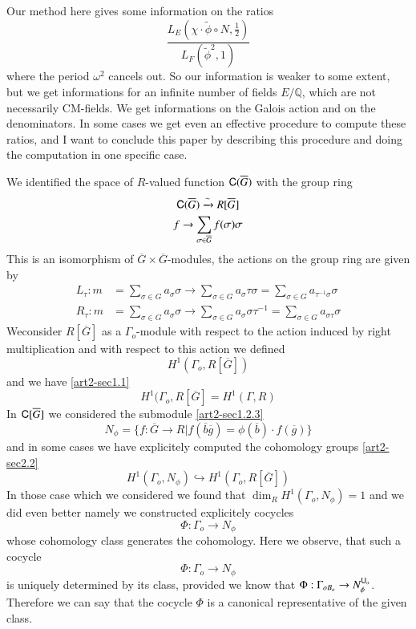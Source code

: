 Our method here gives some information on the ratios
$$
\frac{L_{E}\left(\chi\cdot \widetilde{\phi}\circ N,\frac{1}{2}\right)}{L_{F}(\widetilde{\phi}^{2},1)}
$$
where the period $\omega^{2}$ cancels out. So our information is weaker to some extent, but we get informations for an infinite number of fields $E/\mathbb{Q}$, which are not necessarily CM-fields. We get informations on the Galois action and on the denominators. In some cases we get even an effective procedure to compute these ratios, and I want to conclude this paper by describing this procedure and doing the computation in one specific case.

We identified the space of $R$-valued function $\mathsf{C}(\overline{G})$ with the group ring
\begin{gather*}
\mathsf{C}(\overline{G})\xrightarrow{\sim}R[\overline{G}]\\
f\to \sum\limits_{\sigma\in \overline{G}}f(\sigma)\sigma
\end{gather*}
This is an isomorphism of $\overline{G}\times \overline{G}$-modules, the actions on the group ring are given by
\begin{align*}
L_{\tau}:m &= \sum\limits_{\sigma\in G}a_{\sigma}\sigma\to \sum\limits_{\sigma\in G}a_{\sigma}\tau \sigma=\sum\limits_{\sigma\in G}a_{\tau^{-1}\sigma}\sigma\\[4pt]
R_{\tau}:m &=\sum\limits_{\sigma\in G}a_{\sigma}\sigma\to \sum\limits_{\sigma\in G}a_{\sigma}\sigma \tau^{-1}=\sum\limits_{\sigma\in G}a_{\sigma\tau}\sigma
\end{align*}
We\pageoriginale consider $R[\overline{G}]$ as a $\Gamma_{o}$-module with respect to the action induced by right multiplication and with respect to this action we defined 
$$
H^{1}(\Gamma_{o},R[\overline{G}])
$$ 
and we have \eqref{art2-sec1.1}
$$
H^{1}(\Gamma_{o},R[\overline{G}]=H^{1}(\Gamma,R)
$$
In $\mathsf{C}[\overline{G}]$ we considered the submodule \eqref{art2-sec1.2.3}
$$
N_{\phi}=\{f:\overline{G}\to R|f(\overline{b}\overline{g})=\phi(\overline{b})\cdot f(\overline{g})\}
$$
and in some cases we have explicitely computed the cohomology groups \eqref{art2-sec2.2}
$$
H^{1}(\Gamma_{o},N_{\phi})\hookrightarrow H^{1}(\Gamma_{o},R[\overline{G}])
$$
In those case which we considered we found that $\dim_{R}H^{1}(\Gamma_{o},N_{\phi})=1$ and we did even better namely we constructed explicitely cocycles
$$
\Phi:\Gamma_{o}\to N_{\phi}
$$
whose cohomology class generates the cohomology. Here we observe, that such a cocycle
$$
\Phi :\Gamma_{o}\to N_{\phi}
$$
is uniquely determined by its class, provided we know that $\Phi:\Gamma_{oB_{o}}\to N_{\phi}^{\mathsf{U}_{o}}$. Therefore we can say that the cocycle $\Phi$ is a canonical representative of the given class.

